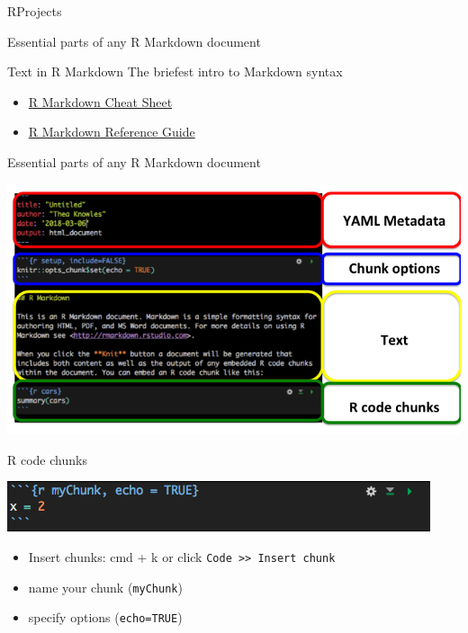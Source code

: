 \documentclass[
  ignorenonframetext,
]{beamer}
\providecommand{\tightlist}{%
  \setlength{\itemsep}{0pt}\setlength{\parskip}{0pt}}
\begin{document}
\begin{frame}[fragile]{RProjects}
\begin{block}{Essential parts of any R Markdown document}
\end{block}

\begin{block}{Text in R Markdown \textbar{} The briefest intro to
Markdown syntax}

\begin{itemize}
\tightlist
\item
  \href{https://www.rstudio.com/wp-content/uploads/2016/03/rmarkdown-cheatsheet-2.0.pdf}{R
  Markdown Cheat Sheet}
\item
  \href{https://www.rstudio.com/wp-content/uploads/2016/03/rmarkdown-cheatsheet-2.0.pdf}{R
  Markdown Reference Guide}
\end{itemize}

\end{block}

\begin{block}{Essential parts of any R Markdown document}

\includegraphics{images/rmarkdown_parts.png}

\end{block}

\begin{block}{R code chunks}

\includegraphics{images/mychunk.png}

\begin{itemize}
\tightlist
\item
  Insert chunks: cmd + k or click
  \texttt{Code\ \textgreater{}\textgreater{}\ Insert\ chunk}
\item
  name your chunk (\texttt{myChunk})
\item
  specify options (\texttt{echo=TRUE})
\end{itemize}


\end{block}
\end{frame}
\end{document}
